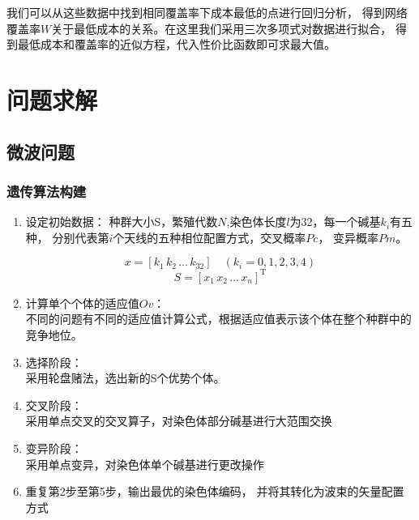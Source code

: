 \documentclass[UTF8,12pt]{ctexart}
\begin{document}
        我们可以从这些数据中找到相同覆盖率下成本最低的点进行回归分析，
        得到网络覆盖率$W$关于最低成本的关系。在这里我们采用三次多项式对数据进行拟合，
        得到最低成本和覆盖率的近似方程，代入性价比函数即可求最大值。


   


\section{问题求解}

    \subsection{微波问题}

        \subsubsection{遗传算法构建}
            \begin{enumerate}
                \item 设定初始数据：
                种群大小S，繁殖代数$N$,染色体长度$l$为32，每一个碱基$k_i$有五种，
                分别代表第$i$个天线的五种相位配置方式，交叉概率$Pc$，
                变异概率$Pm$。
                \begin{large}
                    $$x = \left[ k_1 \, k_2 \, \ldots \, k_{32}\right]
                \quad (k_i =  0,1,2,3,4)$$                
                $$S = \left[x_1 \, x _2 \,  \ldots \,  x_{n}\right]^{\text{T}}$$
                
                \end{large}
                \item 计算单个个体的适应值$Ov$：\\
                不同的问题有不同的适应值计算公式，根据适应值表示该个体在整个种群中的竞争地位。
                \item 选择阶段：\\
                采用轮盘赌法，选出新的S个优势个体。
                \item 交叉阶段：\\
                采用单点交叉的交叉算子，对染色体部分碱基进行大范围交换
                \item 变异阶段：\\
                采用单点变异，对染色体单个碱基进行更改操作
                \item 重复第2步至第5步，输出最优的染色体编码，
                并将其转化为波束的矢量配置方式
            \end{enumerate}
        
\end{document}

